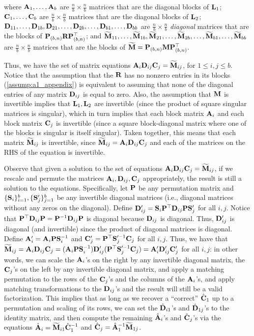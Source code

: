 where $\mathbf{A}_1,\dots,\mathbf{A}_b$ are $\frac{n}{b} \times \frac{n}{b}$ matrices that are the diagonal blocks of $\mathbf{L}_1$; $\mathbf{C}_1,\dots,\mathbf{C}_b$ are $\frac{n}{b} \times \frac{n}{b}$ matrices that are the diagonal blocks of $\mathbf{L}_2$; $\mathbf{D}_{11},\dots,\mathbf{D}_{1b},\mathbf{D}_{21},\dots,\mathbf{D}_{2b},\dots,\mathbf{D}_{b1},\dots,\mathbf{D}_{bb}$ are $\frac{n}{b} \times \frac{n}{b}$ \emph{diagonal} matrices that are the blocks of $\mathbf{P}_{(b,n)} \mathbf{R} \mathbf{P}_{(b,n)}^\top$; and
$\widetilde{\mathbf{M}}_{11},\dots,\widetilde{\mathbf{M}}_{1b},\widetilde{\mathbf{M}}_{21},\dots,\widetilde{\mathbf{M}}_{2b},\dots,\widetilde{\mathbf{M}}_{b1},\dots,\widetilde{\mathbf{M}}_{bb}$ are $\frac{n}{b} \times \frac{n}{b}$ matrices that are the blocks of $\widetilde{\mathbf{M}} = \mathbf{P}_{(b,n)} \mathbf{M} \mathbf{P}_{(b,n)}^\top$.

Thus, we have the set of matrix equations $\mathbf{A}_i \mathbf{D}_{ij} \mathbf{C}_j = \widetilde{\mathbf{M}}_{ij}$, for $1 \le i, j \le b$. Notice that the assumption that the $\mathbf{R}$ has no nonzero entries in its blocks (\cref{assump:a1_appendix}) is equivalent to assuming that none of the diagonal entries of any matrix $\mathbf{D}_{ij}$ is equal to zero. Also, the assumption that $\mathbf{M}$ is invertible implies that $\mathbf{L}_1, \mathbf{L}_2$ are invertible (since the product of square singular matrices is singular), which in turn implies that each block matrix $\mathbf{A}_i$ and each block matrix $\mathbf{C}_j$ is invertible (since a square block-diagonal matrix where one of the blocks is singular is itself singular). Taken together, this means that each matrix $\widetilde{\mathbf{M}}_{ij}$ is invertible, since $\widetilde{\mathbf{M}}_{ij} = \mathbf{A}_i \mathbf{D}_{ij} \mathbf{C}_j$ and each of the matrices on the RHS of the equation is invertible.

Observe that given a solution to the set of equations $\mathbf{A}_i \mathbf{D}_{ij} \mathbf{C}_j = \widetilde{\mathbf{M}}_{ij}$, if we rescale and permute the matrices $\mathbf{A}_i, \mathbf{D}_{ij}, \mathbf{C}_j$ appropriately, the result is still a solution to the equations. Specifically, let $\mathbf{P}$ be any permutation matrix and $\{\mathbf{S}_i\}_{i=1}^b, \{\mathbf{S}_j'\}_{j=1}^b$ be any invertible diagonal matrices (i.e., diagonal matrices without any zeros on the diagonal). 
Define $\mathbf{D}_{ij}' = \mathbf{S}_i \mathbf{P}^\top {\mathbf{D}}_{ij} \mathbf{P} \mathbf{S}_j'$ for all $i, j$. Notice that $\mathbf{P}^\top \mathbf{D}_{ij} \mathbf{P} = \mathbf{P}^{-1} \mathbf{D}_{ij} \mathbf{P}$ is diagonal because $\mathbf{D}_{ij}$ is diagonal. Thus, $\mathbf{D}_{ij}'$ is diagonal (and invertible) since the product of diagonal matrices is diagonal. Define $\mathbf{A}_i' = \mathbf{A}_i \mathbf{P} \mathbf{S}_i^{-1}$ and $\mathbf{C}_j' = \mathbf{P}^\top \mathbf{S}_j'^{-1} \mathbf{C}_j$ for all $i, j$.
Thus, we have that $\widetilde{\mathbf{M}}_{ij} = \mathbf{A}_i \mathbf{D}_{ij} \mathbf{C}_j = (\mathbf{A}_i \mathbf{P} \mathbf{S}_i^{-1} ) \mathbf{D}_{ij}' (\mathbf{P}^\top \mathbf{S}_j'^{-1} \mathbf{C}_j) = {\mathbf{A}}_i' \mathbf{D}_{ij}' \mathbf{C}_j'$ for all $i, j$: in other words, we can scale the $\mathbf{A}_i$'s on the right by any invertible diagonal matrix, the $\mathbf{C}_j$'s on the left by any invertible diagonal matrix, and apply a matching permutation to the rows of the $\mathbf{C}_j$'s and the columns of the $\mathbf{A}_i$'s, and apply matching transformations to the $\mathbf{D}_{ij}$'s and the result will still be a valid factorization. This implies that as long as we recover a ``correct'' $\hat{\mathbf{C}}_1$ up to a permutation and scaling of its rows, we can set the $\hat{\mathbf{D}}_{i1}$'s and $\hat{\mathbf{D}}_{1j}$'s to the identity matrix, and then compute the remaining $\hat{\mathbf{A}}_i$'s and $\hat{\mathbf{C}}_j$'s via the equations $\hat{\mathbf{A}}_i = \widetilde{\mathbf{M}}_{i1}\hat{\mathbf{C}}_1^{-1}$ and $\hat{\mathbf{C}}_j = \hat{\mathbf{A}}_1^{-1}\widetilde{\mathbf{M}}_{1j}$.


